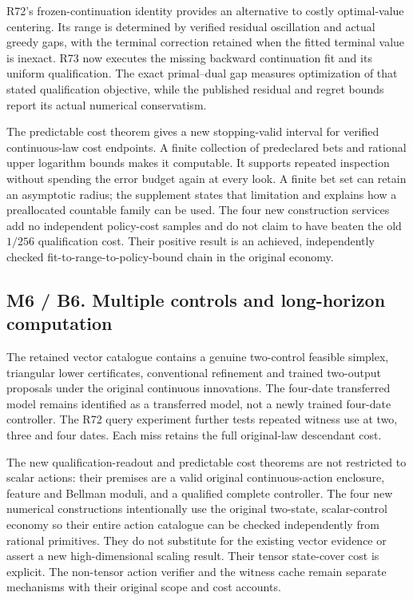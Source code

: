 R72's frozen-continuation identity provides an alternative to costly
optimal-value centering. Its range is determined by verified residual
oscillation and actual greedy gaps, with the terminal correction
retained when the fitted terminal value is inexact. R73 now executes the
missing backward continuation fit and its uniform qualification. The
exact primal--dual gap measures optimization of that stated
qualification objective, while the published residual and regret bounds
report its actual numerical conservatism.

The predictable cost theorem gives a new stopping-valid interval for
verified continuous-law cost endpoints. A finite collection of
predeclared bets and rational upper logarithm bounds makes it
computable. It supports repeated inspection without spending the error
budget again at every look. A finite bet set can retain an asymptotic
radius; the supplement states that limitation and explains how a
preallocated countable family can be used. The four new construction
services add no independent policy-cost samples and do not claim to have
beaten the old \(1/256\) qualification cost. Their positive result is an
achieved, independently checked fit-to-range-to-policy-bound chain in
the original economy.

\hypertarget{m6-b6.-multiple-controls-and-long-horizon-computation}{%
\subsection{M6 / B6. Multiple controls and long-horizon
computation}\label{m6-b6.-multiple-controls-and-long-horizon-computation}}

The retained vector catalogue contains a genuine two-control feasible
simplex, triangular lower certificates, conventional refinement and
trained two-output proposals under the original continuous innovations.
The four-date transferred model remains identified as a transferred
model, not a newly trained four-date controller. The R72 query
experiment further tests repeated witness use at two, three and four
dates. Each miss retains the full original-law descendant cost.

The new qualification-readout and predictable cost theorems are not
restricted to scalar actions: their premises are a valid original
continuous-action enclosure, feature and Bellman moduli, and a qualified
complete controller. The four new numerical constructions intentionally
use the original two-state, scalar-control economy so their entire
action catalogue can be checked independently from rational primitives.
They do not substitute for the existing vector evidence or assert a new
high-dimensional scaling result. Their tensor state-cover cost is
explicit. The non-tensor action verifier and the witness cache remain
separate mechanisms with their original scope and cost accounts.

